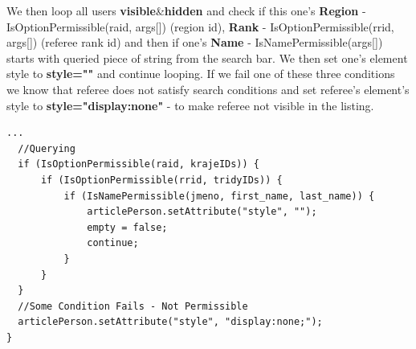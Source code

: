 \newline
We then loop all users \textbf{visible}\&\textbf{hidden} and check if this one's \textbf{Region} - IsOptionPermissible(raid, args[]) (region id), \textbf{Rank} - IsOptionPermissible(rrid, args[]) (referee rank id) and then if one's \textbf{Name} - IsNamePermissible(args[]) starts with queried piece of string from the search bar. We then set one's element style to \textbf{style=""} and continue looping. If we fail one of these three conditions we know that referee does not satisfy search conditions and set referee's element's style to \textbf{style="display:none"} - to make referee not visible in the listing.
\begin{lstlisting}
...  
  //Querying
  if (IsOptionPermissible(raid, krajeIDs)) {
      if (IsOptionPermissible(rrid, tridyIDs)) {
          if (IsNamePermissible(jmeno, first_name, last_name)) {
              articlePerson.setAttribute("style", "");
              empty = false;
              continue;
          }
      }
  }
  //Some Condition Fails - Not Permissible
  articlePerson.setAttribute("style", "display:none;");
}  
\end{lstlisting}

